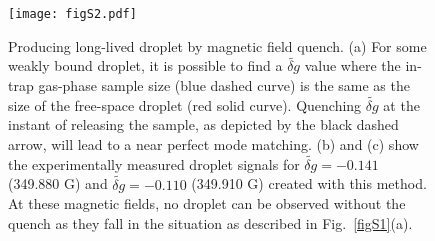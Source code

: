 \begin{figure}[ht]
\begin{center}
\texttt{[image: figS2.pdf]}
\end{center}
\caption[Producing long-lived droplet by magnetic field quench]{Producing long-lived droplet by magnetic field quench. (a) For some weakly bound droplet, it is possible to find a $\widetilde{\delta g}$ 
value where the in-trap gas-phase sample size (blue dashed curve) is the same as the size of the free-space droplet (red solid curve). Quenching $\widetilde{\delta g}$ at the instant of releasing the sample, as depicted by the black dashed arrow, will lead to a near perfect mode matching. (b) and (c) show the experimentally measured droplet signals for $\widetilde{\delta g} = -0.141$ (349.880 G) and $\widetilde{\delta g} = -0.110$ (349.910 G) created with this method. At these magnetic fields, no 
droplet can be observed without the quench as they fall in the situation as described in Fig.~\ref{figS1}(a).}
\label{figS2}
\end{figure}


